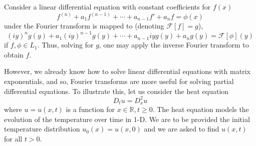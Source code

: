 \documentclass[]{article}
\theoremstyle{definition}
\theoremstyle{definition}
\begin{document}
Consider a linear 
differential equation with constant coefficients for \(f(x)\) 
\[f^{(n)} + a_1 f^{(n - 1)} + \cdots + a_{n - 1}f' + a_n f = \phi(x)\]
under the Fourier transform is mapped to (denoting \(\mathcal{F}[f] = g\)),
\[(iy)^ng(y) + a_1 (iy)^{n - 1}g(y) + \cdots + a_{n - 1} iy g(y) + a_n g(y) = \mathcal{F}[\phi](y)\]
if \(f, \phi \in L_1\). Thus, solving for \(g\), one may apply the inverse Fourier 
transform to obtain \(f\). 

However, we already know how to solve linear differential equations with matrix exponentials, 
and so, Fourier transforms are more useful for solving partial differential equations.
To illustrate this, let us consider the heat equation
\[D_t u = D_x^2 u\]
where \(u = u(x, t)\) is a function for \(x \in \mathbb{R}, t \ge 0\). The heat 
equation models the evolution of the temperature over time in 1-D. 
We are to be provided the initial temperature distribution \(u_0(x) = u(x, 0)\) 
and we are asked to find \(u(x, t)\) for all \(t > 0\). 
\end{document}

